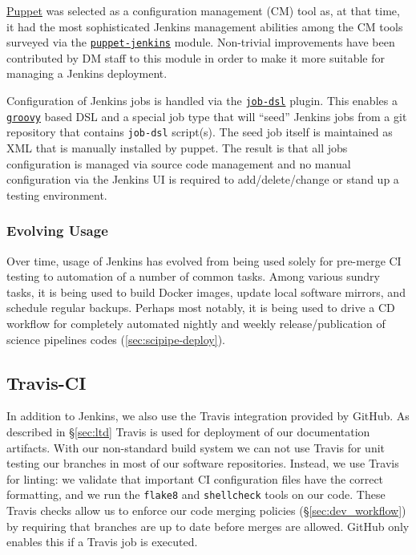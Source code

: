 \href{https://puppet.com/}{Puppet} was selected as a configuration management (CM) tool as, at that time, it had the most sophisticated Jenkins
management abilities among the CM tools surveyed via the \href{https://github.com/voxpupuli/puppet-jenkins}{\texttt{puppet-jenkins}} module.
Non-trivial improvements have been contributed by DM staff to this module\cite{puppetconf-jenkins} in order to make it more suitable for managing a Jenkins deployment.

Configuration of Jenkins jobs is handled via the \href{https://plugins.jenkins.io/job-dsl}{\texttt{job-dsl}} plugin.
This enables a \href{http://www.groovy-lang.org/}{\texttt{groovy}} based DSL and a special job type that
will ``seed'' Jenkins jobs from a git repository that contains \texttt{job-dsl}
script(s).  The seed job itself is maintained as XML that is manually
installed by puppet.  The result is that all jobs configuration is managed via
source code management and no manual configuration via the Jenkins UI is required to
add/delete/change or stand up a testing environment.



\subsubsection{Evolving Usage}

Over time, usage of Jenkins has evolved from being used solely for pre-merge
CI testing to automation of a number of common tasks.  Among various sundry
tasks, it is being used to build Docker images, update local software mirrors, and
schedule regular backups.  Perhaps most notably, it is being used to drive a
CD workflow for completely automated nightly and weekly
release/publication of science pipelines codes (\ref{sec:scipipe-deploy}).

\subsection{Travis-CI}
\label{sec:travis-ci}

In addition to Jenkins, we also use the Travis integration provided by GitHub.
As described in \S\ref{sec:ltd} Travis is used for deployment of our documentation artifacts.
With our non-standard build system we can not use Travis for unit testing our branches in most of our software repositories.
Instead, we use Travis for linting: we validate that important CI configuration files have the correct formatting, and we run the \texttt{flake8} and \texttt{shellcheck} tools on our code.
These Travis checks allow us to enforce our code merging policies (\S\ref{sec:dev_workflow}) by requiring that branches are up to date before merges are allowed.
GitHub only enables this if a Travis job is executed.
